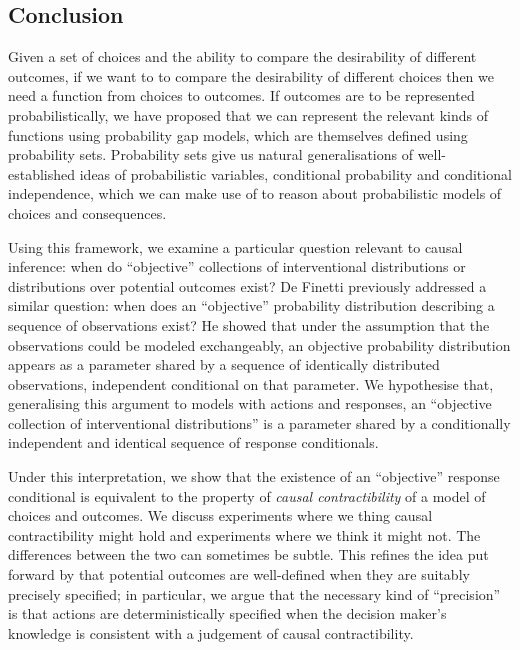 
\subsection{Conclusion}

Given a set of choices and the ability to compare the desirability of different outcomes, if we want to to compare the desirability of different choices then we need a function from choices to outcomes. If outcomes are to be represented probabilistically, we have proposed that we can represent the relevant kinds of functions using probability gap models, which are themselves defined using probability sets. Probability sets give us natural generalisations of well-established ideas of probabilistic variables, conditional probability and conditional independence, which we can make use of to reason about probabilistic models of choices and consequences.

Using this framework, we examine a particular question relevant to causal inference: when do ``objective'' collections of interventional distributions or distributions over potential outcomes exist? De Finetti previously addressed a similar question: when does an ``objective'' probability distribution describing a sequence of observations exist? He showed that under the assumption that the observations could be modeled exchangeably, an objective probability distribution appears as a parameter shared by a sequence of identically distributed observations, independent conditional on that parameter. We hypothesise that, generalising this argument to models with actions and responses, an ``objective collection of interventional distributions'' is a parameter shared by a conditionally independent and identical sequence of response conditionals.

Under this interpretation, we show that the existence of an ``objective'' response conditional is equivalent to the property of \emph{causal contractibility} of a model of choices and outcomes. We discuss experiments where we thing causal contractibility might hold and experiments where we think it might not. The differences between the two can sometimes be subtle. This refines the idea put forward by \citet{noauthor_does_2016} that potential outcomes are well-defined when they are suitably precisely specified; in particular, we argue that the necessary kind of ``precision'' is that actions are deterministically specified when the decision maker's knowledge is consistent with a judgement of causal contractibility.

